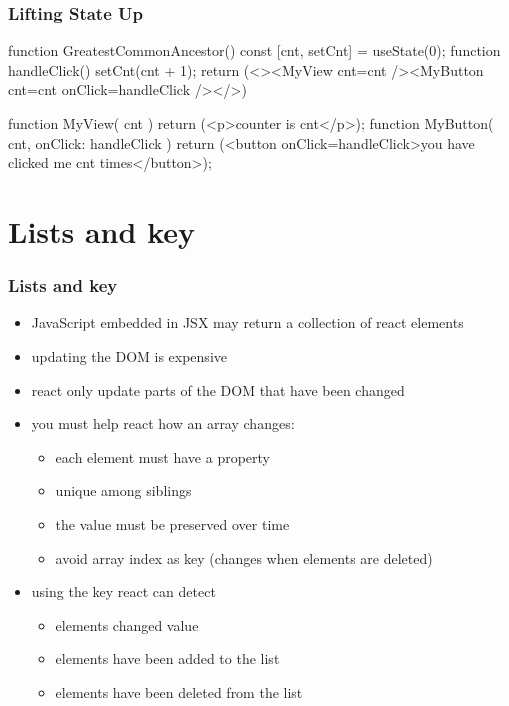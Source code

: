 \begin{frame}[fragile] \frametitle{Lifting State Up}
\begin{CodeBox}{}
function GreatestCommonAncestor() {
  const [cnt, setCnt] = useState(0);
  function handleClick() { setCnt(cnt + 1); }
  return (<><MyView cnt={cnt} /><MyButton cnt={cnt} onClick={handleClick} /></>)
}

function MyView({ cnt }) {
  return (<p>counter is {cnt}</p>);
}
function MyButton({ cnt, onClick: handleClick }) {
  return (<button onClick={handleClick}>you have clicked me {cnt} times</button>);
}
\end{CodeBox}
\end{frame}

\section{Lists and key}
\begin{frame}[fragile] \frametitle{Lists and key}
\begin{itemize}
  \item JavaScript embedded in JSX may return a collection of react elements
  \item updating the DOM is expensive
  \item react only update parts of the DOM that have been changed
  \item you must help react how an array changes:
  \begin{itemize}
    \item each element must have a  property
    \item unique among siblings
    \item the value must be preserved over time
    \item avoid array index as key (changes when elements are deleted)
  \end{itemize}
  \item using the key react can detect
  \begin{itemize}
    \item elements changed value
    \item elements have been added to the list
    \item elements have been deleted from the list
  \end{itemize}
\end{itemize}
\end{frame}


